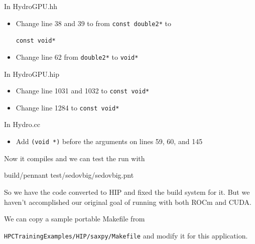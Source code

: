 \documentclass[
]{article}
\providecommand{\tightlist}{%
  \setlength{\itemsep}{0pt}\setlength{\parskip}{0pt}}
\let\oldtexttt\texttt
\renewcommand{\texttt}[1]{
  \colorbox{Light}{\oldtexttt{#1}}
}
\newenvironment{Shaded}{}{}
\newcommand{\ExtensionTok}[1]{#1}
\newcommand{\NormalTok}[1]{#1}
\providecommand{\tightlist}{%
  \setlength{\itemsep}{0pt}\setlength{\parskip}{0pt}}
\begin{document}
In HydroGPU.hh

\begin{itemize}
\tightlist
\item
  Change line 38 and 39 to from \texttt{const\ double2*} to
  \texttt{const\ void*}
\item
  Change line 62 from \texttt{double2*} to \texttt{void*}
\end{itemize}

In HydroGPU.hip

\begin{itemize}
\tightlist
\item
  Change line 1031 and 1032 to \texttt{const\ void*}
\item
  Change line 1284 to \texttt{const\ void*}
\end{itemize}

In Hydro.cc

\begin{itemize}
\tightlist
\item
  Add \texttt{(void\ *)} before the arguments on lines 59, 60, and 145
\end{itemize}

Now it compiles and we can test the run with

\begin{Shaded}
\begin{Highlighting}[]
\ExtensionTok{build/pennant}\NormalTok{ test/sedovbig/sedovbig.pnt}
\end{Highlighting}
\end{Shaded}

So we have the code converted to HIP and fixed the build system for it.
But we haven't accomplished our original goal of running with both ROCm
and CUDA.

We can copy a sample portable Makefile from
\texttt{HPCTrainingExamples/HIP/saxpy/Makefile} and modify it for this
application.
\end{document}
